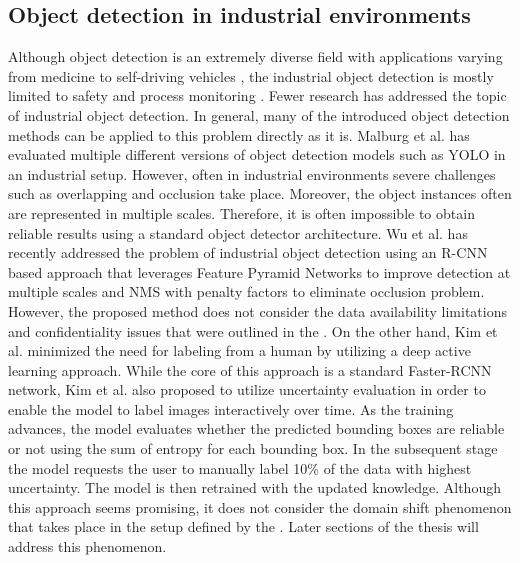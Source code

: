 \documentclass[english, 12pt, a4paper, elec, utf8, a-1b, online]{aaltothesis}
\begin{document}
\subsection{Object detection in industrial environments}
Although object detection is an extremely diverse field with applications varying from medicine \cite{9689485} to self-driving vehicles \cite{Janai2017, Shan2018}, the industrial object detection is mostly limited to safety and process monitoring \cite{Awalgaonkar2020, Banf2022}. Fewer research has addressed the topic of industrial object detection. In general, many of the introduced object detection methods can be applied to this problem directly as it is. Malburg et al. \cite{MALBURG2021581} has evaluated multiple different versions of object detection models such as YOLO \cite{Redmon2015a} in an industrial setup. However, often in industrial environments severe challenges such as overlapping and occlusion take place. Moreover, the object instances often are represented in multiple scales. Therefore, it is often impossible to obtain reliable results using a standard object detector architecture. Wu et al. \cite{Wu2022} has recently addressed the problem of industrial object detection using an R-CNN based approach that leverages Feature Pyramid Networks to improve detection at multiple scales and NMS with penalty factors to eliminate occlusion problem. However, the proposed method does not consider the data availability limitations and confidentiality issues that were outlined in the . On the other hand, Kim et al. \cite{Kim2020} minimized the need for labeling from a human by utilizing a deep active learning approach. While the core of this approach is a standard Faster-RCNN \cite{ima} network, Kim et al. also proposed to utilize uncertainty evaluation in order to enable the model to label images interactively over time. As the training advances, the model evaluates whether the predicted bounding boxes are reliable or not using the sum of entropy for each bounding box. In the subsequent stage the model requests the user to manually label 10\% of the data with highest uncertainty. The model is then retrained with the updated knowledge. Although this approach seems promising, it  does not consider the domain shift phenomenon that takes place in the setup defined by the . Later sections of the thesis will address this phenomenon. 

\end{document}
